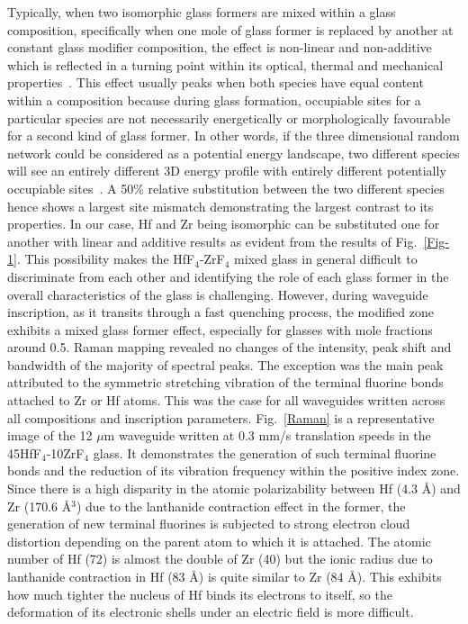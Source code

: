 \documentclass[11pt]{article}
\begin{document}
Typically, when two isomorphic glass formers are mixed within a glass composition, specifically when one mole of glass former is replaced by another at constant glass modifier composition, the effect is non-linear and non-additive which is reflected in a turning point within its optical, thermal and mechanical properties~\cite{Wang2017}. This effect usually peaks when both species have equal content within a composition because during glass formation, occupiable sites for a particular species are not necessarily energetically or morphologically favourable for a second kind of glass former. In other words, if the three dimensional random network could be considered as a potential energy landscape, two different species will see an entirely different 3D energy profile with entirely different potentially occupiable sites~\cite{Dyre2009}. A 50\% relative substitution between the two different species hence shows a largest site mismatch demonstrating the largest contrast to its properties. 
In our case, Hf and Zr being isomorphic can be substituted one for another with linear and additive results as evident from the results of Fig.~\ref{Fig-1}. This possibility makes the HfF$_4$-ZrF$_4$ mixed glass in general difficult to discriminate from each other and identifying the role of each glass former in the overall characteristics of the glass is challenging. However, during waveguide inscription, as it transits through a fast quenching process, the modified zone exhibits a mixed glass former effect, especially for glasses with mole fractions around 0.5. 
Raman mapping revealed no changes of the intensity, peak shift and bandwidth of the majority of spectral peaks. The exception was the main peak attributed to the symmetric stretching vibration of the terminal fluorine bonds attached to Zr or Hf atoms. This was the case for all waveguides written across all compositions and inscription parameters. Fig.~\ref{Raman} is a representative image of the 12 $\mu$m waveguide written at 0.3 mm/s translation speeds in the 45HfF$_4$-10ZrF$_4$ glass. It demonstrates the generation of such terminal fluorine bonds and the reduction of its vibration frequency within the positive index zone. 
Since there is a high disparity in the atomic polarizability between Hf (4.3 Å) and Zr (170.6 Å$^3$) due to the lanthanide contraction effect in the former, the generation of new terminal fluorines is subjected to strong electron cloud distortion depending on the parent atom to which it is attached. The atomic number of Hf (72) is almost the double of Zr (40) but the ionic radius due to lanthanide contraction in Hf (83 Å) is quite similar to Zr (84 Å). This exhibits how much tighter the nucleus of Hf binds its electrons to itself, so the deformation of its electronic shells under an electric field is more difficult. 
\end{document}
